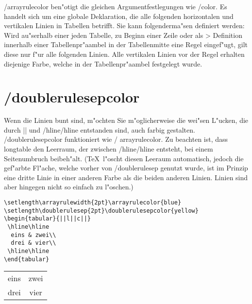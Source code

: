 \documentclass[ngerman]{article}
\begin{document}
{\slash \textsf{arrayrulecolor} ben"otigt die gleichen Argumentfestlegungen
wie \slash \textsf{color}. Es handelt sich um eine globale Deklaration, die alle folgenden 
horizontalen und vertikalen Linien in Tabellen betrifft. Sie kann
folgenderma"sen definiert werden: Wird au"serhalb einer jeden Tabelle, zu Beginn einer Zeile oder 
als > Definition innerhalb einer Tabellenpr"aambel in der Tabellenmitte eine Regel eingef"ugt, gilt 
diese nur f"ur alle folgenden Linien. Alle vertikalen Linien vor der Regel erhalten diejenige Farbe, 
welche in der Tabellenpr"aambel festgelegt wurde.

\section{\slash \textsf{doublerulesepcolor}}
Wenn die Linien bunt sind, m"ochten Sie m"oglicherweise die wei"sen L"ucken, die durch || und 
\slash \textsf{hline}\slash \textsf{hline} entstanden sind, auch farbig gestalten. 
\slash \textsf{doublerulesepcolor} funktioniert wie \slash
\textsf{arrayrulecolor}. Zu beachten ist, dass \textsf{longtable} den Leerraum, der zwischen 
\slash \textsf{hline}\slash \textsf{hline} entsteht, bei einem
Seitenumbruch beibeh"alt. (\TeX\ 
l"oscht diesen Leeraum automatisch, jedoch  die gef"arbte Fl"ache, welche
vorher von \slash \textsf{doublerulesep} genutzt wurde, 
ist im Prinzip eine dritte Linie in einer anderen Farbe als die beiden 
anderen Linien. Linien sind aber hingegen nicht so einfach zu l"oschen.)

\begin{center}
\setlength\arrayrulewidth{2pt}
\setlength\doublerulesep{2pt}

\begin{minipage}{.75\textwidth}
\begin{verbatim}
\setlength\arrayrulewidth{2pt}\arrayrulecolor{blue}
\setlength\doublerulesep{2pt}\doublerulesepcolor{yellow}
\begin{tabular}{||l||c||}
 \hline\hline
  eins & zwei\\
  drei & vier\\
 \hline\hline
\end{tabular}
\end{verbatim}
\end{minipage}
 {\bfseries
  \begin{tabular}{|l||c||}
  \hline\hline
  eins&zwei\\
  drei&vier\\
  \hline\hline
  \end{tabular}}
 \end{center}

}
\end{document}
